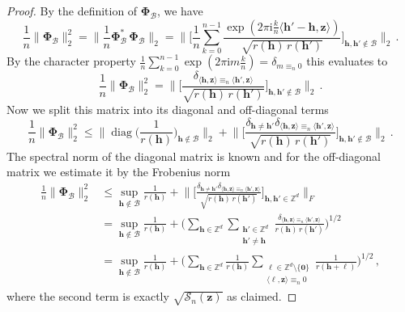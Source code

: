\documentclass[a4paper]{amsart}
\DeclareMathOperator{\Diag}{diag}
\begin{document}
\begin{proof} By the definition of $\bm\Phi_{\mathcal B}$, we have
    \begin{equation*}
        \frac 1n \|\bm\Phi_{\mathcal B}\|_{2}^2
        = \Big\| \frac 1n \bm\Phi_{\mathcal B}^\ast \, \bm\Phi_{\mathcal B} \Big\|_{2}
        = \Big\|\Big[ \frac 1n \sum_{k=0}^{n-1} \frac{\exp(2\pi\mathrm i\tfrac kn\langle\bm h'-\bm h,\bm z\rangle)}{\sqrt{r(\bm h) \, r(\bm h')}} \Big]_{\bm h,\bm h'\notin\mathcal B} \Big\|_{2} \,.
    \end{equation*}
    By the character property $\frac 1n \sum_{k=0}^{n-1} \exp(2\pi\mathrm i m\tfrac kn) = \delta_{m\equiv_n 0}$ this evaluates to
    \begin{equation*}
        \frac 1n \|\bm\Phi_{\mathcal B}\|_{2}^2
        = \Big\|\Big[ \frac{\delta_{\langle\bm h,\bm z\rangle \equiv_n \langle\bm h',\bm z\rangle}}{\sqrt{r(\bm h) \, r(\bm h')}} \Big]_{\bm h,\bm h'\notin\mathcal B} \Big\|_{2} \,.
    \end{equation*}
    Now we split this matrix into its diagonal and off-diagonal terms
    \begin{equation*}
        \frac 1n \|\bm\Phi_{\mathcal B}\|_{2}^2
        \le \Big\| \Diag\Big( \frac{1}{r(\bm h)}\Big)_{\bm h\notin\mathcal B} \Big\|_{2}
        + \Big\|\Big[ \frac{\delta_{\bm h\neq\bm h'} \delta_{\langle\bm h,\bm z\rangle \equiv_n \langle\bm h',\bm z\rangle}}{\sqrt{r(\bm h) \, r(\bm h')}} \Big]_{\bm h,\bm h'\notin\mathcal B} \Big\|_{2} \,.
    \end{equation*}
    The spectral norm of the diagonal matrix is known and for the off-diagonal matrix we estimate it by the Frobenius norm
    \begin{align*}
        \frac 1n \|\bm\Phi_{\mathcal B}\|_{2}^2
        &\le \sup_{\bm h\notin\mathcal B} \frac{1}{r(\bm h)}
        + \Big\|\Big[ \frac{\delta_{\bm h\neq\bm h'} \delta_{\langle\bm h,\bm z\rangle \equiv_n \langle\bm h',\bm z\rangle}}{\sqrt{r(\bm h) \, r(\bm h')}} \Big]_{\bm h,\bm h'\in\mathds Z^d} \Big\|_{F} \\
        &= \sup_{\bm h\notin\mathcal B} \frac{1}{r(\bm h)}
        + \Big( \sum_{\bm h\in\mathds Z^d} \sum_{\substack{\bm h'\in\mathds Z^d \\ \bm h'\neq\bm h}} \frac{\delta_{\langle\bm h,\bm z\rangle \equiv_n \langle\bm h',\bm z\rangle}}{r(\bm h) \, r(\bm h')} \Big)^{1/2} \\
        &= \sup_{\bm h\notin\mathcal B} \frac{1}{r(\bm h)}
        + \Big( \sum_{\bm h\in\mathds Z^d} \frac{1}{r(\bm h)} \sum_{\substack{\bm\ell\in\mathds Z^d\setminus\{\bm 0\} \\\langle\bm\ell,\bm z\rangle\equiv_n 0}} \frac{1}{r(\bm h+\bm\ell)} \Big)^{1/2} \,,
    \end{align*}
    where the second term is exactly $\sqrt{\mathcal S_n(\bm z)}$ as claimed.
\end{proof} 
\end{document}
